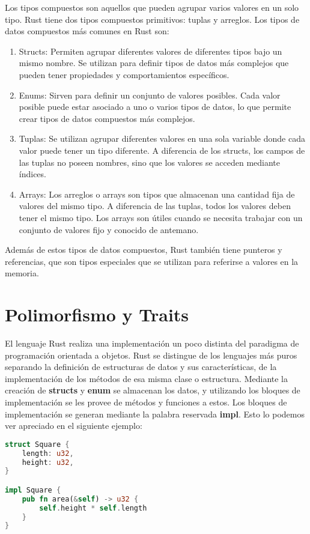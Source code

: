 Los tipos compuestos son aquellos que pueden agrupar varios valores en un solo tipo. Rust tiene dos tipos compuestos primitivos: tuplas y arreglos. Los tipos de datos compuestos más comunes en Rust son:
\begin{enumerate}
    \item Structs: Permiten agrupar diferentes valores de diferentes tipos bajo un mismo nombre. Se utilizan para definir tipos de datos más complejos que pueden tener propiedades y comportamientos específicos.
    \item Enums: Sirven para definir un conjunto de valores posibles. Cada valor posible puede estar asociado a uno o varios tipos de datos, lo que permite crear tipos de datos compuestos más complejos.
    \item Tuplas: Se utilizan agrupar diferentes valores en una sola variable donde cada valor puede tener un tipo diferente. A diferencia de los structs, los campos de las tuplas no poseen nombres, sino que los valores se acceden mediante índices.
    \item Arrays: Los arreglos o arrays son tipos que almacenan una cantidad fija de valores del mismo tipo. A diferencia de las tuplas, todos los valores deben tener el mismo tipo. Los arrays son útiles cuando se necesita trabajar con un conjunto de valores fijo y conocido de antemano.
\end{enumerate}

Además de estos tipos de datos compuestos, Rust también tiene punteros y referencias, que son tipos especiales que se utilizan para referirse a valores en la memoria.

\section{Polimorfismo y Traits}

El lenguaje Rust realiza una implementación un poco distinta del paradigma de programación orientada a objetos. Rust se distingue de los lenguajes más puros separando la definición de estructuras de datos y sus características, de la implementación de los métodos de esa misma clase o estructura. Mediante la creación de \textbf{structs} y \textbf{enum} se almacenan los datos, y utilizando los bloques de implementación se les provee de métodos y funciones a estos. Los bloques de implementación se generan mediante la palabra reservada \textbf{impl}. Esto lo podemos ver apreciado en el siguiente ejemplo:

\begin{lstlisting}[language=Rust]
struct Square {
    length: u32,
    height: u32,
}

impl Square {
    pub fn area(&self) -> u32 {
        self.height * self.length
    }
}
\end{lstlisting}

